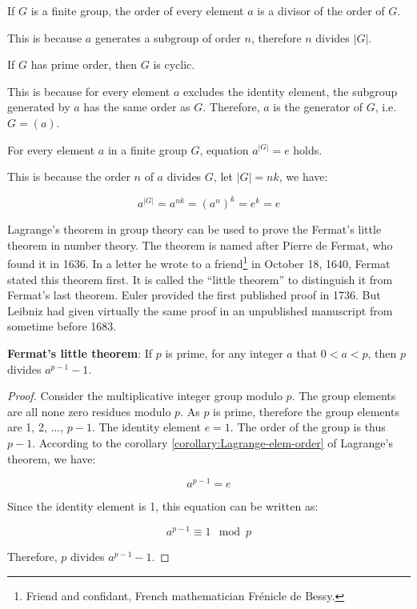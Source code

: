 \documentclass[b5paper]{article}
\begin{document}
\begin{corollary}
If $G$ is a finite group, the order of every element $a$ is a divisor of the order of $G$.
\end{corollary}

This is because $a$ generates a subgroup of order $n$, therefore $n$ divides $|G|$.

\begin{corollary}
If $G$ has prime order, then $G$ is cyclic.
\end{corollary}

This is because for every element $a$ excludes the identity element, the subgroup generated by $a$ has the same order as $G$. Therefore, $a$ is the generator of $G$, i.e. $G = (a)$.

\begin{corollary}
For every element $a$ in a finite group $G$, equation $a^{|G|} = e$ holds.
\label{corollary:Lagrange-elem-order}
\end{corollary}

This is because the order $n$ of $a$ divides $G$, let $|G| = nk$, we have:

\[
a^{|G|} = a^{nk} = (a^n)^k = e^k = e
\]

Lagrange's theorem in group theory can be used to prove the Fermat's little theorem in number theory. The theorem is named after Pierre de Fermat, who found it in 1636. In a letter he wrote to a friend\footnote{Friend and confidant, French mathematician Frénicle de Bessy.} in October 18, 1640, Fermat stated this theorem first. It is called the ``little theorem'' to distinguish it from Fermat's last theorem. Euler provided the first published proof in 1736. But Leibniz had given virtually the same proof in an unpublished manuscript from sometime before 1683.

\begin{theorem}
\textbf{Fermat's little theorem}: If $p$ is prime, for any integer $a$ that $0 < a < p$, then $p$ divides $a^{p-1}-1$.
\end{theorem}

\begin{proof}
Consider the multiplicative integer group modulo $p$. The group elements are all none zero residues modulo $p$. As $p$ is prime, therefore the group elements are 1, 2, ..., $p-1$. The identity element $e = 1$. The order of the group is thus $p-1$. According to the corollary \ref{corollary:Lagrange-elem-order} of Lagrange's theorem, we have:

\[
a^{p-1} = e
\]

Since the identity element is 1, this equation can be written as:

\[
a^{p-1} \equiv 1 \mod p
\]

Therefore, $p$ divides $a^{p-1} - 1$.
\end{proof}
\end{document}
